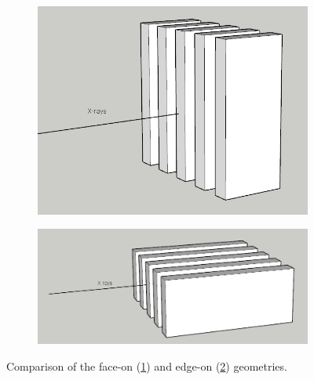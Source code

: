 \begin{figure}[htb]
    \centering
    \begin{subfigure}[b]{.45\textwidth}
    \centering
    \includegraphics[width=\textwidth]{gfx/faceon.png}
    \caption{}
    \label{fig:faceon-sketch}
    \end{subfigure}
    \hfill
    \begin{subfigure}[b]{.45\textwidth}
    \centering
    \includegraphics[width=\textwidth]{gfx/edgeon.png}
    \caption{}
    \label{fig:edgeon-sketch}
    \end{subfigure}
    \caption[Comparison of the edge-on and face-on geometries.]{
        Comparison of the face-on (\ref{fig:faceon-sketch}) and edge-on
        (\ref{fig:edgeon-sketch}) geometries.
    }
    \label{fig:faceon-edgeon-sketch}
\end{figure}

